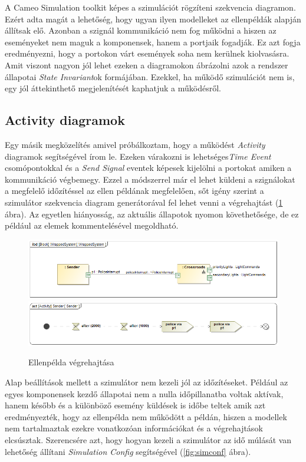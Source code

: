 A Cameo Simulation toolkit képes a szimulációt rögzíteni szekvencia diagramon. Ezért adta magát a lehetőség, hogy ugyan ilyen modelleket az ellenpéldák alapján állítsak elő. Azonban a szignál kommunikáció nem fog működni a hiszen az eseményeket nem maguk a komponensek, hanem a portjaik fogadják. Ez azt fogja eredményezni, hogy a portokon várt események soha nem kerülnek kiolvasásra. Amit viszont nagyon jól lehet ezeken a diagramokon ábrázolni azok a rendszer állapotai \emph{State Invariant}ok formájában. Ezekkel, ha működő szimulációt nem is, egy jól áttekinthető megjelenítését kaphatjuk a működésről.

\subsection{Activity diagramok}
Egy másik megközelítés amivel próbálkoztam, hogy a működést \emph{Activity} diagramok segítségével írom le. Ezeken várakozni is lehetséges\emph{Time Event} csomópontokkal és a \emph{Send Signal} eventek képesek kijelölni a portokat amiken a kommunikáció végbemegy. Ezzel a módszerrel már el lehet küldeni a szignálokat a megfelelő időzítéssel az ellen példának megfelelően, sőt igény szerint a szimulátor szekvencia diagram generátorával fel lehet venni a végrehajtást (\ref{fig:activity-counter-example} ábra). Az egyetlen hiányosság, az aktuális állapotok nyomon követhetősége, de ez például az elemek kommentelésével megoldható.
\begin{figure}[!ht]
	\centering
	\includegraphics[width=140mm, keepaspectratio]{figures/contribution/WrappedSystem1.png}
	\includegraphics[width=140mm, keepaspectratio]{figures/contribution/Sender.png}
	\caption{Ellenpélda végrehajtása}
	\label{fig:activity-counter-example}
\end{figure}
Alap beállítások mellett a szimulátor nem kezeli jól az időzítéseket. Például az egyes komponensek kezdő állapotai nem a nulla időpillanatba voltak aktívak, hanem később és a különböző esemény küldések is időbe teltek amik azt eredményezték, hogy az ellenpélda nem működött a példán, hiszen a modellek nem tartalmaztak ezekre vonatkozóan információkat és a végrehajtások elcsúsztak. Szerencsére azt, hogy hogyan kezeli a szimulátor az idő múlását van lehetőség állítani \emph{Simulation Config} segítségével (\ref{fig:simconf} ábra).

